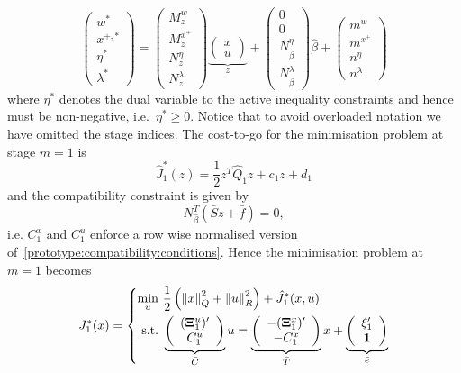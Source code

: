 \documentclass[journal]{IEEEtran}
\providecommand{\norm}[1]{\left\|#1\right\|}
\theoremstyle{remark}
\theoremstyle{definition}
\begin{document}
\[
      \left(\begin{array}{c}
      w^\ast \\
      x^{+,\ast} \\
      \eta^\ast \\
      \lambda^\ast
      \end{array}\right) = \left(\begin{array}{c}M^w_z\\ M^{x^+}_z \\ N^{\eta}_z \\ N^{\lambda}_z
      \end{array}\right)\underbrace{\left(\begin{array}{c}x\\ u\end{array}\right)}_z + 
      \left(\begin{array}{c}0\\ 0 \\ N^{\eta}_{\hat\beta} \\ N^{\lambda}_{\hat\beta}
      \end{array}\right)\hat\beta + \left(\begin{array}{c}m^w\\ m^{x^+} \\ n^{\eta} \\ n^{\lambda}
      \end{array}\right)
\]
%
where $\eta^\ast$ denotes the dual variable to the active inequality constraints and hence must
be non-negative, i.e.~$\eta^\ast\geq0$. 
%
Notice that to avoid overloaded notation we have omitted the stage indices.
%
The cost-to-go for the minimisation problem at stage $m=1$ is
%
\[
  \hat J_1^\ast(z) = \frac{1}{2}z^T
    \hat Q_1 z + c_1 z + d_1
\]
%
and the compatibility constraint is given by
%
\begin{equation}\label{prototype:compatibility:conditions}
  N_{\hat\beta}^T(\bar S z + \bar f) = 0,
\end{equation}
%
i.e. $C_1^x$ and $C_1^u$ enforce a row wise normalised version of~\eqref{prototype:compatibility:conditions}.
%
Hence the minimisation problem at $m=1$ becomes
%
\[
  J_1^\ast(x) = \left\{\begin{split}
  \min_{u} \ & \frac{1}{2}\left(\norm{x}^2_Q + \norm{u}_R^2\right) + \hat J_{1}^\ast(x,u)\\
    \text{s.t.} \ & 
    \underbrace{\left(\begin{array}{c}
    ({\bf{\Xi}}_1^u)^\prime \\ C_1^u
    \end{array}\right)}_{\bar C}
    u
    = \underbrace{\left(\begin{array}{c}-({\bf{\Xi}}^x_1)^\prime \\ -C_1^x\end{array}\right)}_{
    \bar T
    }x + 
    \underbrace{\left(\begin{array}{c}{\bf{\xi}}_1^\prime\\  {\bf{1}} \end{array}\right)}_{\bar e}
    \end{split}\right.
\]
\end{document}

